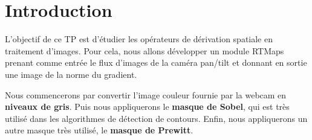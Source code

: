 \chapter{Introduction}

L'objectif de ce TP est d'étudier les opérateurs de dérivation spatiale en traitement d'images. Pour cela, nous allons développer un module RTMaps prenant comme entrée le flux d'images de la caméra pan/tilt et donnant en sortie une image de la norme du gradient.

\bigskip

Nous commencerons par convertir l'image couleur fournie par la webcam en \textbf{niveaux de gris}. Puis nous appliquerons le \textbf{masque de Sobel}, qui est très utilisé dans les algorithmes de détection de contours. Enfin, nous appliquerons un autre masque très utilisé, le \textbf{masque de Prewitt}.